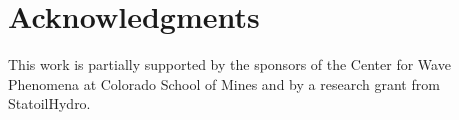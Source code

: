 \section{Acknowledgments}
This work is partially supported by the sponsors of the Center for
Wave Phenomena at Colorado School of Mines and by a research grant
from StatoilHydro.

